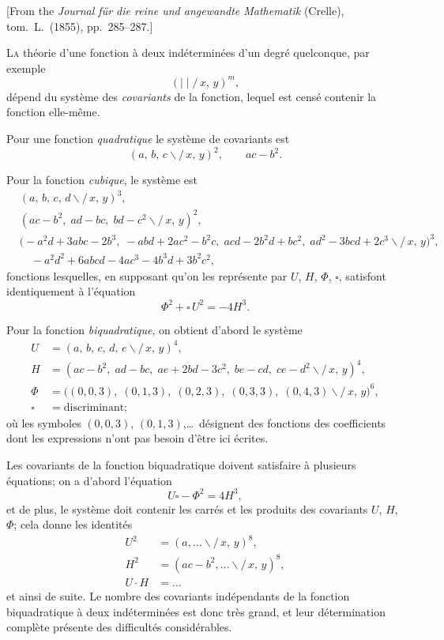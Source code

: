 \documentclass[11pt,a4paper]{book}
\begin{document}
[From the \textit{Journal f\"ur die reine und angewandte Mathematik} (Crelle),
tom.\ L.\ (1855), pp.\ 285--287.]

\medskip

\textsc{La} th\'eorie d'une fonction \`a deux ind\'etermin\'ees d'un degr\'e
quelconque, par exemple
\[
(\mid\mid\!\!\!/\,x,\, y)^m,
\]
d\'epend du syst\`eme des \textit{covariants} de la fonction, lequel est
cens\'e contenir la fonction elle-m\^eme.

Pour une fonction \textit{quadratique} le syst\`eme de covariants est
\[
(a,\, b,\, c\!\!\backslash\!\!\!/\,x,\, y)^2,\qquad ac-b^2.
\]

Pour la fonction \textit{cubique}, le syst\`eme est
\begin{align*}
&(a,\, b,\, c,\, d\!\!\backslash\!\!\!/\,x,\, y)^3, \\
&(ac-b^2,\; ad-bc,\; bd-c^2 \backslash\!\!\!/\,x,\, y)^2, \\
&\bigl(-a^2d + 3abc - 2b^3,\; -abd + 2ac^2 - b^2c,\;
acd - 2b^2d + bc^2,\; ad^2 - 3bcd + 2c^3 \backslash\!\!\!/\,x,\, y\bigr)^3, \\
&\quad -a^2d^2 + 6abcd - 4ac^3 - 4b^3d + 3b^2c^2,
\end{align*}
fonctions lesquelles, en supposant qu'on les repr\'esente par $U$, $H$,
$\Phi$, $\square$, satisfont identiquement \`a l'\'equation
\[
\Phi^2 + \square\,U^2 = -4H^3.
\]

Pour la fonction \textit{biquadratique}, on obtient d'abord le syst\`eme
\begin{align*}
U &= (a,\, b,\, c,\, d,\, e\!\!\backslash\!\!\!/\,x,\, y)^4, \\
H &= (ac-b^2,\; ad-bc,\; ae + 2bd - 3c^2,\; be-cd,\; ce-d^2
\backslash\!\!\!/\,x,\, y)^4, \\
\Phi &= \bigl( (0,0,3),\; (0,1,3),\; (0,2,3),\; (0,3,3),\;
(0,4,3) \backslash\!\!\!/\,x,\, y\bigr)^6, \\
\square &= \text{discriminant};
\end{align*}
o\`u les symboles $(0,0,3)$, $(0,1,3)$,\ldots\ d\'esignent des fonctions
des coefficients dont les expressions n'ont pas besoin d'\^etre ici
\'ecrites.

\medskip

Les covariants de la fonction biquadratique doivent satisfaire \`a
plusieurs \'equations; on a d'abord l'\'equation
\[
U\square - \Phi^2 = 4H^3,
\]
et de plus, le syst\`eme doit contenir les carr\'es et les produits des
covariants $U$, $H$, $\Phi$; cela donne les identit\'es
\begin{align*}
U^2 &= (a,\ldots \backslash\!\!\!/\,x,\, y)^8, \\
H^2 &= (ac-b^2,\ldots \backslash\!\!\!/\,x,\, y)^8, \\
U\cdot H &= \ldots
\end{align*}
et ainsi de suite. Le nombre des covariants ind\'ependants de la fonction
biquadratique \`a deux ind\'etermin\'ees est donc tr\`es grand, et leur
d\'etermination compl\`ete pr\'esente des difficult\'es consid\'erables.
\end{document}
